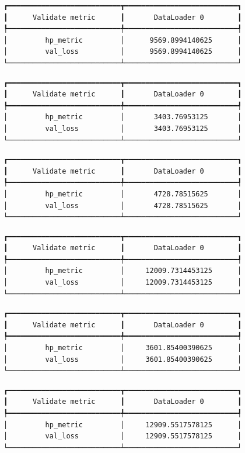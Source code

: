 \documentclass[
  letterpaper,
  DIV=11,
  numbers=noendperiod]{scrreprt}
\begin{document}
\begin{verbatim}
┏━━━━━━━━━━━━━━━━━━━━━━━━━━━┳━━━━━━━━━━━━━━━━━━━━━━━━━━━┓
┃      Validate metric      ┃       DataLoader 0        ┃
┡━━━━━━━━━━━━━━━━━━━━━━━━━━━╇━━━━━━━━━━━━━━━━━━━━━━━━━━━┩
│         hp_metric         │      9569.8994140625      │
│         val_loss          │      9569.8994140625      │
└───────────────────────────┴───────────────────────────┘
\end{verbatim}

\begin{verbatim}
┏━━━━━━━━━━━━━━━━━━━━━━━━━━━┳━━━━━━━━━━━━━━━━━━━━━━━━━━━┓
┃      Validate metric      ┃       DataLoader 0        ┃
┡━━━━━━━━━━━━━━━━━━━━━━━━━━━╇━━━━━━━━━━━━━━━━━━━━━━━━━━━┩
│         hp_metric         │       3403.76953125       │
│         val_loss          │       3403.76953125       │
└───────────────────────────┴───────────────────────────┘
\end{verbatim}

\begin{verbatim}
┏━━━━━━━━━━━━━━━━━━━━━━━━━━━┳━━━━━━━━━━━━━━━━━━━━━━━━━━━┓
┃      Validate metric      ┃       DataLoader 0        ┃
┡━━━━━━━━━━━━━━━━━━━━━━━━━━━╇━━━━━━━━━━━━━━━━━━━━━━━━━━━┩
│         hp_metric         │       4728.78515625       │
│         val_loss          │       4728.78515625       │
└───────────────────────────┴───────────────────────────┘
\end{verbatim}

\begin{verbatim}
┏━━━━━━━━━━━━━━━━━━━━━━━━━━━┳━━━━━━━━━━━━━━━━━━━━━━━━━━━┓
┃      Validate metric      ┃       DataLoader 0        ┃
┡━━━━━━━━━━━━━━━━━━━━━━━━━━━╇━━━━━━━━━━━━━━━━━━━━━━━━━━━┩
│         hp_metric         │     12009.7314453125      │
│         val_loss          │     12009.7314453125      │
└───────────────────────────┴───────────────────────────┘
\end{verbatim}

\begin{verbatim}
┏━━━━━━━━━━━━━━━━━━━━━━━━━━━┳━━━━━━━━━━━━━━━━━━━━━━━━━━━┓
┃      Validate metric      ┃       DataLoader 0        ┃
┡━━━━━━━━━━━━━━━━━━━━━━━━━━━╇━━━━━━━━━━━━━━━━━━━━━━━━━━━┩
│         hp_metric         │     3601.85400390625      │
│         val_loss          │     3601.85400390625      │
└───────────────────────────┴───────────────────────────┘
\end{verbatim}

\begin{verbatim}
┏━━━━━━━━━━━━━━━━━━━━━━━━━━━┳━━━━━━━━━━━━━━━━━━━━━━━━━━━┓
┃      Validate metric      ┃       DataLoader 0        ┃
┡━━━━━━━━━━━━━━━━━━━━━━━━━━━╇━━━━━━━━━━━━━━━━━━━━━━━━━━━┩
│         hp_metric         │     12909.5517578125      │
│         val_loss          │     12909.5517578125      │
└───────────────────────────┴───────────────────────────┘
\end{verbatim}
\end{document}

